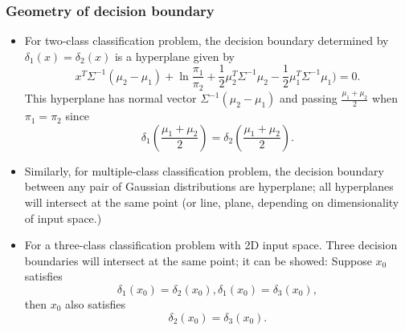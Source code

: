 \begin{refsection}
\subsubsection{Geometry of decision boundary}

\begin{remark}\hfill
	\begin{itemize}
		\item For two-class classification problem, the decision boundary determined by $\delta_1(x) = \delta_2(x)$ is a hyperplane given by 
		$$	x^T\Sigma^{-1}(\mu_2-\mu_1) + \ln \frac{\pi_1}{\pi_2} +  \frac{1}{2}\mu_2^T\Sigma^{-1}\mu_2 - \frac{1}{2}\mu_1^T\Sigma^{-1}\mu_1) = 0.$$
		This hyperplane has normal vector $\Sigma^{-1}(\mu_2-\mu_1)$ and passing $\frac{\mu_1 + \mu_2}{2}$ when $\pi_1 = \pi_2$ since $$\delta_1(\frac{\mu_1 + \mu_2}{2}) = \delta_2(\frac{\mu_1 + \mu_2}{2}).$$
		\item Similarly, for multiple-class classification problem, the decision boundary between any pair of Gaussian distributions are hyperplane; all hyperplanes will intersect at the same point (or line, plane, depending on dimensionality of input space.) 
		\item For a three-class classification problem with 2D input space. Three decision boundaries will intersect at the same point; it can be showed:
		Suppose $x_0$ satisfies 
		$$\delta_1(x_0) = \delta_2(x_0), \delta_1(x_0) = \delta_3(x_0),$$
		then $x_0$ also satisfies
		$$\delta_2(x_0) = \delta_3(x_0).$$
		
	\end{itemize}	
\end{remark}


\end{refsection}
